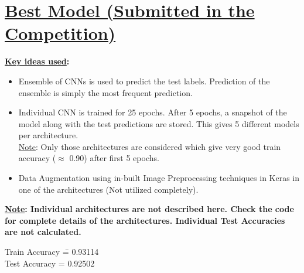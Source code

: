 \documentclass[12pt]{article}
\begin{document}
\section*{\underline{Best Model (Submitted in the Competition)}}
\begin{addmargin}[0.3in]{0in}
\textbf{\underline{Key ideas used}: }
\begin{itemize}
    \item Ensemble of CNNs is used to predict the test labels. Prediction of the ensemble is simply the most frequent prediction.
    \item Individual CNN is trained for 25 epochs. After 5 epochs, a snapshot of the model along with the test predictions are stored. This gives 5 different models per architecture. \\
    \underline{Note}: Only those architectures are considered which give very good train accuracy ($\approx$ 0.90) after first 5 epochs.
    \item Data Augmentation using in-built Image Preprocessing techniques in Keras in one of the architectures (Not utilized completely).
\end{itemize}
\textbf{\underline{Note}: Individual architectures are not described here. Check the code for complete details of the architectures. Individual Test Accuracies are not calculated.} \\
\begin{tabbing}
Train Accuracy \= = 0.93114 \\
Test Accuracy \> = 0.92502 \\
\end{tabbing}
\end{addmargin}
\end{document}

